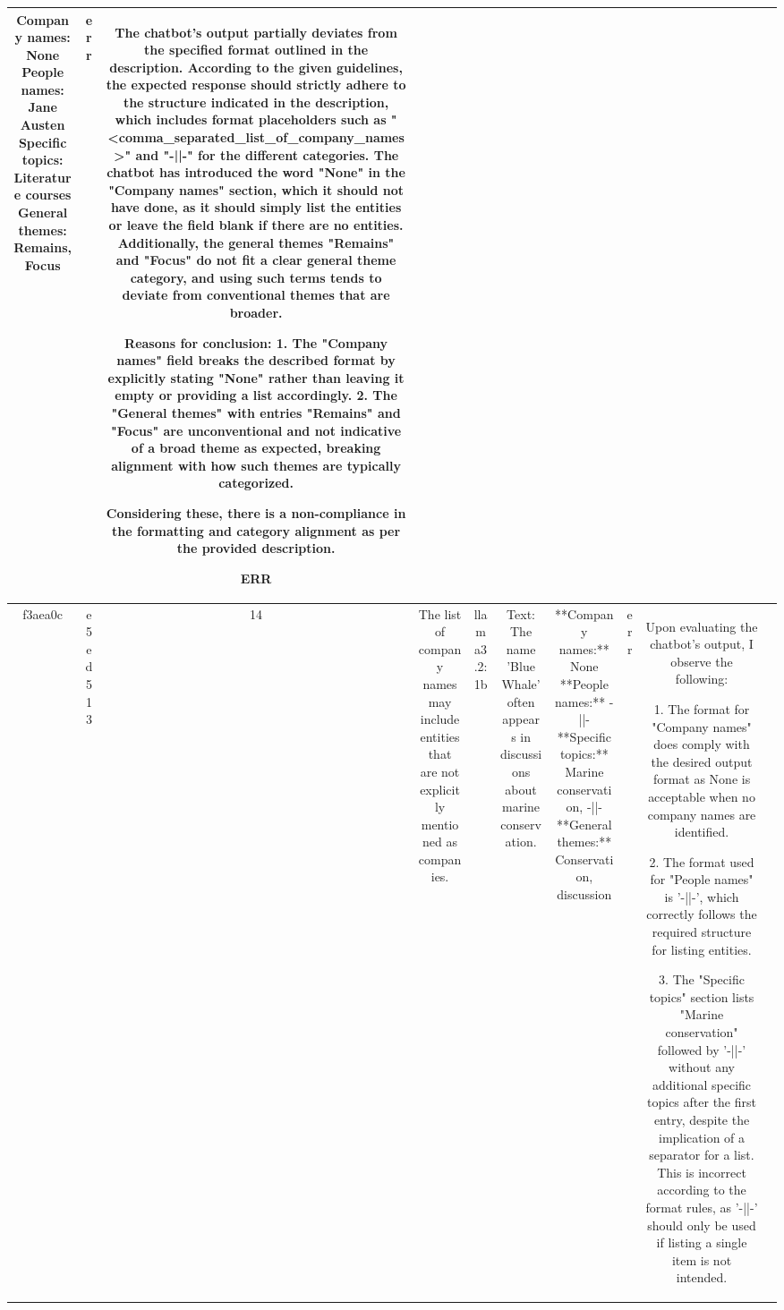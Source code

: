 \begin{table}[h!]
\begin{tabular}{|c|c|c|c|c|c|c|c|c|c|}
Company names: None
People names: Jane Austen
Specific topics: Literature courses
General themes: Remains, Focus & err & The chatbot's output partially deviates from the specified format outlined in the description. According to the given guidelines, the expected response should strictly adhere to the structure indicated in the description, which includes format placeholders such as "<comma_separated_list_of_company_names>" and "-||-" for the different categories. The chatbot has introduced the word "None" in the "Company names" section, which it should not have done, as it should simply list the entities or leave the field blank if there are no entities. Additionally, the general themes "Remains" and "Focus" do not fit a clear general theme category, and using such terms tends to deviate from conventional themes that are broader.

Reasons for conclusion:
1. The "Company names" field breaks the described format by explicitly stating "None" rather than leaving it empty or providing a list accordingly.
2. The "General themes" with entries "Remains" and "Focus" are unconventional and not indicative of a broad theme as expected, breaking alignment with how such themes are typically categorized.

Considering these, there is a non-compliance in the formatting and category alignment as per the provided description.

ERR & \\
\hline
f3aea0c & e5ed513 & 14 & The list of company names may include entities that are not explicitly mentioned as companies. & llama3.2:1b & Text: The name 'Blue Whale' often appears in discussions about marine conservation. & **Company names:** None
**People names:** -||-
**Specific topics:** Marine conservation, -||-
**General themes:** Conservation, discussion & err & Upon evaluating the chatbot's output, I observe the following:

1. The format for "Company names" does comply with the desired output format as None is acceptable when no company names are identified.

2. The format used for "People names" is '-||-', which correctly follows the required structure for listing entities.

3. The "Specific topics" section lists "Marine conservation" followed by '-||-' without any additional specific topics after the first entry, despite the implication of a separator for a list. This is incorrect according to the format rules, as '-||-' should only be used if listing a single item is not intended. 


\end{tabular}
\end{table}
